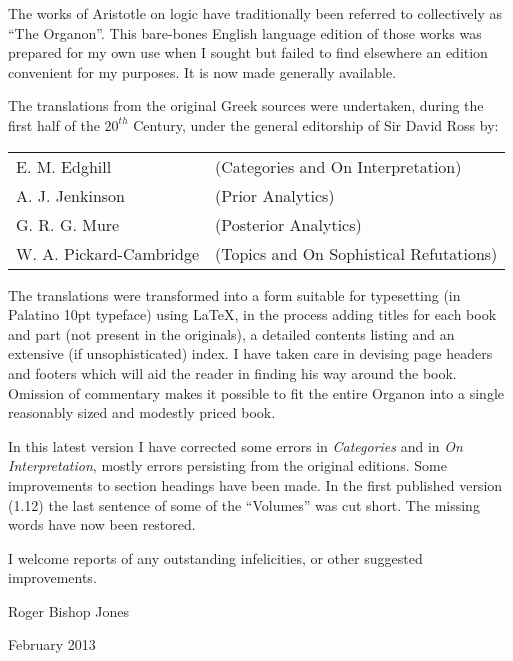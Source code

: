 The works of Aristotle on logic have traditionally been referred to collectively as ``The Organon''. 
This bare-bones English language edition of those works was prepared for my own use when I sought but failed to find elsewhere an edition convenient for my purposes.
It is now made generally available.
 
The translations from the original Greek sources were undertaken, during the first half of the \ensuremath{20^{th}} Century, under the general editorship of Sir David Ross by:

\vspace{0.2in}

\begin{centering}
\begin{tabular}{l l}
E. M. Edghill & (Categories and On Interpretation)\\
A. J. Jenkinson & (Prior Analytics)\\
G. R. G. Mure & (Posterior Analytics)\\
W. A. Pickard-Cambridge & (Topics and On Sophistical Refutations)
\end{tabular}
\end{centering}

\vspace{0.2in}

The translations were transformed into a form suitable for typesetting (in Palatino 10pt typeface) using {\LaTeX}, in the process adding titles for each book and part (not present in the originals), a detailed contents listing and an extensive (if unsophisticated) index.
I have taken care in devising page headers and footers which will aid the reader in finding his way around the book.
Omission of commentary makes it possible to fit the entire Organon into a single reasonably sized and modestly priced book.

In this latest version I have corrected some errors in {\it Categories} and in {\it On Interpretation}, mostly errors persisting from the original editions.
Some improvements to section headings have been made.
In the first published version (1.12) the last sentence of some of the ``Volumes'' was cut short.
The missing words have now been restored.

I welcome reports of any outstanding infelicities, or other suggested improvements.

\vspace{0.2in}

Roger Bishop Jones

February 2013

